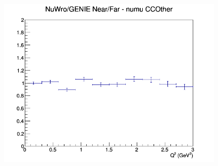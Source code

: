 \documentclass[12pt]{article}
\begin{document}
\begin{figure}[h]
\endminipage
{}
\includegraphics[width=\linewidth]{eff_Q2/LAr/ratios/CCOther_NuWro_GENIE_numu_NF_Q2.png}
\endminipage
\newline
\end{figure}
\clearpage
\end{document}
